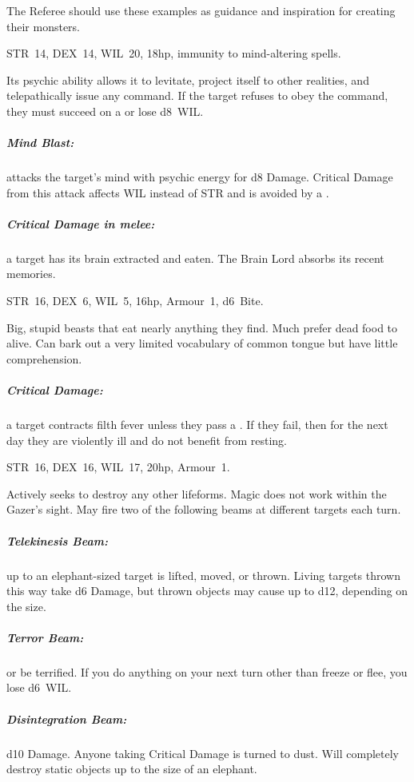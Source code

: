 \documentclass[itdr]{subfiles}
\begin{document}

The Referee should use these examples as guidance and inspiration for creating their monsters.

\vfill

STR~14, DEX~14, WIL~20, 18hp, immunity to mind-altering spells.

Its psychic ability allows it to levitate, project itself to other realities, and telepathically issue any command. If the target refuses to obey the command, they must succeed on a  or lose d8~WIL.

\subparagraph{Mind Blast:} attacks the target's mind with psychic energy for d8 Damage. Critical Damage from this attack affects WIL instead of STR and is avoided by a .

\subparagraph{Critical Damage in melee:} a target has its brain extracted and eaten. The Brain Lord absorbs its recent memories.

\vfill

STR~16, DEX~6, WIL~5, 16hp, Armour~1, d6~Bite.

Big, stupid beasts that eat nearly anything they find. Much prefer dead food to alive. Can bark out a very limited vocabulary of common tongue but have little comprehension.

\subparagraph{Critical Damage:} a target contracts filth fever unless they pass a . If they fail, then for the next day they are violently ill and do not benefit from resting.

\vspace{-1em}
\break

STR~16, DEX~16, WIL~17, 20hp, Armour~1.

Actively seeks to destroy any other lifeforms. Magic does not work within the Gazer's sight. May fire two of the following beams at different targets
each turn.

\subparagraph{Telekinesis Beam:} up to an elephant-sized target is lifted, moved, or thrown. Living targets thrown this way take d6 Damage, but thrown objects may cause up to d12, depending on the size.

\subparagraph{Terror Beam:}  or be terrified. If you do anything on your next turn other than freeze or flee, you lose d6~WIL.

\subparagraph{Disintegration Beam:} d10 Damage. Anyone taking Critical Damage is turned to dust. Will completely destroy static objects up to the size of an elephant.
\end{document}
